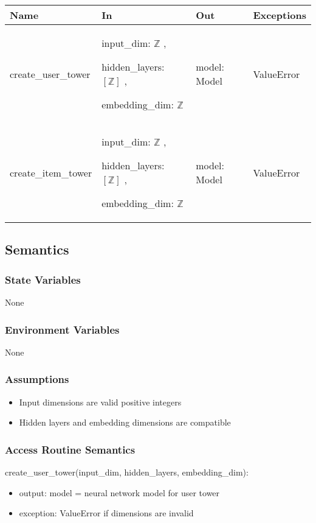 \documentclass[12pt, titlepage]{article}
\begin{document}
\begin{center}
  \begin{tabular}{p{4cm} p{4cm} p{4cm} p{2cm}}
  \hline
  \textbf{Name} & \textbf{In} & \textbf{Out} & \textbf{Exceptions} \\
  \hline
  create\_user\_tower & input\_dim: $\mathbb{Z}$ ,
  
  hidden\_layers: $[\mathbb{Z}]$ ,
  
  embedding\_dim: $\mathbb{Z}$ & model: Model & ValueError \\
  \hline
  create\_item\_tower & input\_dim: $\mathbb{Z}$ ,
  
  hidden\_layers: $[\mathbb{Z}]$ ,
  
  embedding\_dim: $\mathbb{Z}$ & model: Model & ValueError \\
  \hline
  \end{tabular}
  \end{center}

\subsection{Semantics}

\subsubsection{State Variables}
None

\subsubsection{Environment Variables}

None

\subsubsection{Assumptions}

\begin{itemize}
  \item Input dimensions are valid positive integers
  \item Hidden layers and embedding dimensions are compatible
\end{itemize}

\subsubsection{Access Routine Semantics}

\noindent create\_user\_tower(input\_dim, hidden\_layers, embedding\_dim):
\begin{itemize}
\item output: model = neural network model for user tower
\item exception: ValueError if dimensions are invalid
\end{itemize}
\end{document}
